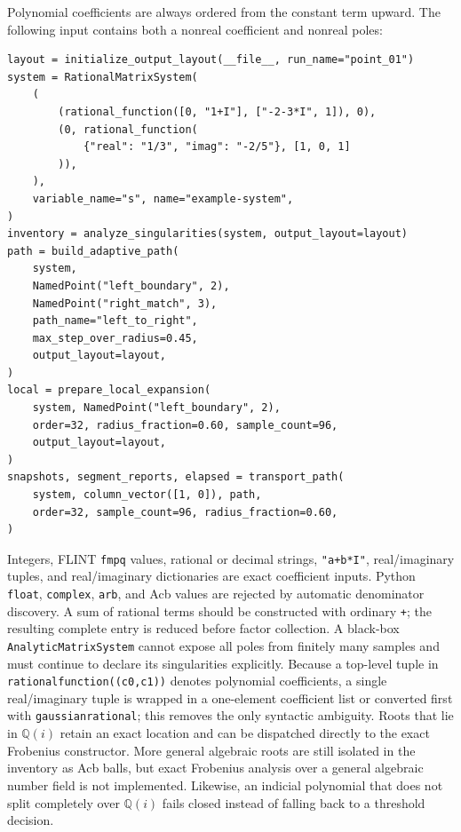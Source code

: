 \documentclass[11pt]{article}
\renewcommand{\_}{\origunderscore\allowbreak}
\begin{document}
Polynomial coefficients are always ordered from the constant term upward.  The following
input contains both a nonreal coefficient and nonreal poles:
\begin{verbatim}
layout = initialize_output_layout(__file__, run_name="point_01")
system = RationalMatrixSystem(
    (
        (rational_function([0, "1+I"], ["-2-3*I", 1]), 0),
        (0, rational_function(
            {"real": "1/3", "imag": "-2/5"}, [1, 0, 1]
        )),
    ),
    variable_name="s", name="example-system",
)
inventory = analyze_singularities(system, output_layout=layout)
path = build_adaptive_path(
    system,
    NamedPoint("left_boundary", 2),
    NamedPoint("right_match", 3),
    path_name="left_to_right",
    max_step_over_radius=0.45,
    output_layout=layout,
)
local = prepare_local_expansion(
    system, NamedPoint("left_boundary", 2),
    order=32, radius_fraction=0.60, sample_count=96,
    output_layout=layout,
)
snapshots, segment_reports, elapsed = transport_path(
    system, column_vector([1, 0]), path,
    order=32, sample_count=96, radius_fraction=0.60,
)
\end{verbatim}
Integers, FLINT \texttt{fmpq} values, rational or decimal strings, \texttt{"a+b*I"},
real/imaginary tuples, and real/imaginary dictionaries are exact coefficient inputs.  Python
\texttt{float}, \texttt{complex}, \texttt{arb}, and Acb values are rejected by automatic
denominator discovery.  A sum of rational terms should be constructed with ordinary
\texttt{+}; the resulting complete entry is reduced before factor collection.  A black-box
\texttt{AnalyticMatrixSystem} cannot expose all poles from finitely many samples and must
continue to declare its singularities explicitly.
Because a top-level tuple in \texttt{rational\_function((c0,c1))} denotes polynomial
coefficients, a single real/imaginary tuple is wrapped in a one-element coefficient list or
converted first with \texttt{gaussian\_rational}; this removes the only syntactic ambiguity.
Roots that lie in $\mathbb Q(i)$ retain an exact location and can be dispatched directly to
the exact Frobenius constructor.  More general algebraic roots are still isolated in the
inventory as Acb balls, but exact Frobenius analysis over a general algebraic number field is
not implemented.  Likewise, an indicial polynomial that does not split completely over
$\mathbb Q(i)$ fails closed instead of falling back to a threshold decision.
\end{document}
